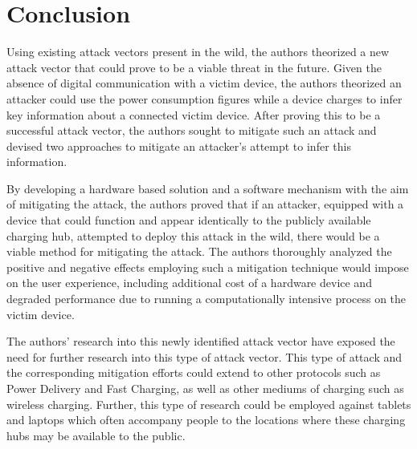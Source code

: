 \section{Conclusion} 
\label{sec:conclusion}
Using existing attack vectors present in the wild, the authors theorized a new attack vector that could prove to be a viable threat in the future. Given the absence of digital communication with a victim device, the authors theorized an attacker could use the power consumption figures while a device charges to infer key information about a connected victim device. After proving this to be a successful attack vector, the authors sought to mitigate such an attack and devised two approaches to mitigate an attacker's attempt to infer this information.

By developing a hardware based solution and a software mechanism with the aim of mitigating the attack, the authors proved that if an attacker, equipped with a device that could function and appear identically to the publicly available charging hub, attempted to deploy this attack in the wild, there would be a viable method for mitigating the attack. The authors thoroughly analyzed the positive and negative effects employing such a mitigation technique would impose on the user experience, including additional cost of a hardware device and degraded performance due to running a computationally intensive process on the victim device.

The authors' research into this newly identified attack vector have exposed the need for further research into this type of attack vector. This type of attack and the corresponding mitigation efforts could extend to other protocols such as Power Delivery and Fast Charging, as well as other mediums of charging such as wireless charging. Further, this type of research could be employed against tablets and laptops which often accompany people to the locations where these charging hubs may be available to the public. 